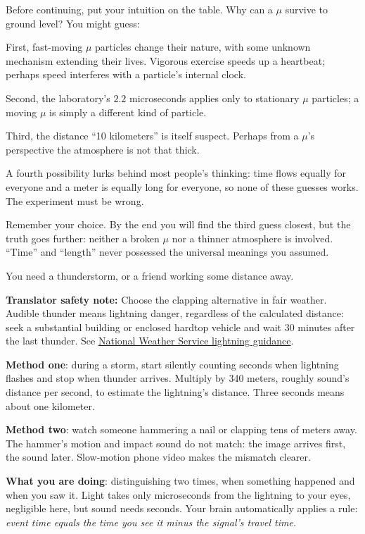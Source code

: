 
\begin{mainline}
Before continuing, put your intuition on the table. Why can a \(\mu\) survive to ground level? You might guess:

First, fast-moving \(\mu\) particles change their nature, with some unknown mechanism extending their lives. Vigorous exercise speeds up a heartbeat; perhaps speed interferes with a particle's internal clock.

Second, the laboratory's \(2.2\) microseconds applies only to stationary \(\mu\) particles; a moving \(\mu\) is simply a different kind of particle.

Third, the distance ``10 kilometers'' is itself suspect. Perhaps from a \(\mu\)'s perspective the atmosphere is not that thick.

A fourth possibility lurks behind most people's thinking: time flows equally for everyone and a meter is equally long for everyone, so none of these guesses works. The experiment must be wrong.

Remember your choice. By the end you will find the third guess closest, but the truth goes further: neither a broken \(\mu\) nor a thinner atmosphere is involved. ``Time'' and ``length'' never possessed the universal meanings you assumed.
\end{mainline}


\begin{experiment}
You need a thunderstorm, or a friend working some distance away.

\textbf{Translator safety note:} Choose the clapping alternative in fair weather. Audible thunder means lightning danger, regardless of the calculated distance: seek a substantial building or enclosed hardtop vehicle and wait 30 minutes after the last thunder. See \href{https://www.weather.gov/safety/lightning-tips}{National Weather Service lightning guidance}.

\textbf{Method one}: during a storm, start silently counting seconds when lightning flashes and stop when thunder arrives. Multiply by 340 meters, roughly sound's distance per second, to estimate the lightning's distance. Three seconds means about one kilometer.

\textbf{Method two}: watch someone hammering a nail or clapping tens of meters away. The hammer's motion and impact sound do not match: the image arrives first, the sound later. Slow-motion phone video makes the mismatch clearer.

\textbf{What you are doing}: distinguishing two times, when something happened and when you saw it. Light takes only microseconds from the lightning to your eyes, negligible here, but sound needs seconds. Your brain automatically applies a rule: \emph{event time equals the time you see it minus the signal's travel time.}
\end{experiment}


